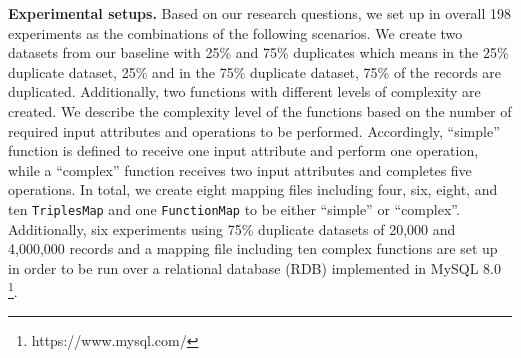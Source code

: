 \noindent\textbf{Experimental setups.} Based on our research questions, we set up in overall 198 experiments as the combinations of the following scenarios. We create two datasets from our baseline with 25\% and 75\% duplicates which means in the 25\% duplicate dataset, 25\% and in the 75\% duplicate dataset, 75\% of the records are duplicated. Additionally, two functions with different levels of complexity are created. We describe the complexity level of the functions based on the number of required input attributes and operations to be performed. Accordingly, ``simple'' function is defined to receive one input attribute and perform one operation, while a ``complex'' function receives two input attributes and completes five operations. In total, we create eight mapping files including four, six, eight, and ten \verb|TriplesMap| and one \verb|FunctionMap| to be either ``simple'' or  ``complex''. Additionally, six experiments using 75\% duplicate datasets of 20,000 and 4,000,000 records and a mapping file including ten complex functions are set up in order to be run over a relational database (RDB) implemented in MySQL 8.0 \footnote{https://www.mysql.com/}.   


